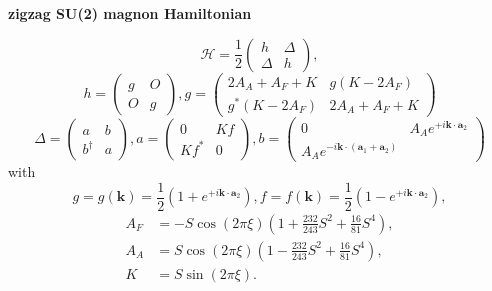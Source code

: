 \documentclass[11pt, aps, longbibliography]{article}
\begin{document}
\begin{tcolorbox}
    \textbf{zigzag SU(2) magnon Hamiltonian}

    \begin{equation}
        \mathcal{H} = \frac{1}{2}\begin{pmatrix}
            h & \Delta \\ \Delta & h
        \end{pmatrix},
    \end{equation}
    \begin{equation}
        h = \begin{pmatrix}
            g & O \\ O & g
        \end{pmatrix}, g = \begin{pmatrix}
            2A_A + A_F + K & g(K-2A_F) \\ g^*(K-2A_F) & 2A_A + A_F + K 
        \end{pmatrix}
    \end{equation}
    \begin{equation}
        \Delta = \begin{pmatrix}
            a & b \\ b^\dagger & a
        \end{pmatrix}, a = \begin{pmatrix}
            0 & Kf \\ Kf^* & 0 
        \end{pmatrix}, b = \begin{pmatrix}
            0 & A_Ae^{+i\bm{k}\cdot\bm{a}_2} \\ A_Ae^{-i\bm{k}\cdot(\bm{a}_1 + \bm{a}_2)}
        \end{pmatrix}
    \end{equation}
    with
    \begin{equation}
        g = g(\bm{k}) = \frac{1}{2}(1 + e^{+i\bm{k}\cdot\bm{a}_2}), f = f(\bm{k}) = \frac{1}{2}(1 - e^{+i\bm{k}\cdot\bm{a}_2}),
    \end{equation}
    \begin{align}
        A_F &= -S\cos(2\pi\xi)\left(1 + \frac{232}{243}S^2 + \frac{16}{81}S^4\right), \\
        A_A &= S\cos(2\pi\xi)\left(1 - \frac{232}{243}S^2 + \frac{16}{81}S^4\right), \\
        K &= S\sin(2\pi\xi).
    \end{align}


\end{tcolorbox}
\end{document}
